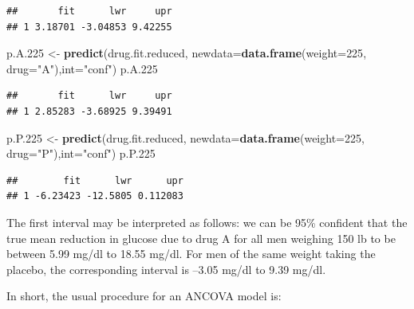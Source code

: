 \documentclass[
]{book}
\newenvironment{Shaded}{\begin{snugshade}}{\end{snugshade}}
\newcommand{\AttributeTok}[1]{\textcolor[rgb]{0.13,0.29,0.53}{#1}}
\newcommand{\DecValTok}[1]{\textcolor[rgb]{0.00,0.00,0.81}{#1}}
\newcommand{\FloatTok}[1]{\textcolor[rgb]{0.00,0.00,0.81}{#1}}
\newcommand{\FunctionTok}[1]{\textcolor[rgb]{0.13,0.29,0.53}{\textbf{#1}}}
\newcommand{\NormalTok}[1]{#1}
\newcommand{\OtherTok}[1]{\textcolor[rgb]{0.56,0.35,0.01}{#1}}
\newcommand{\StringTok}[1]{\textcolor[rgb]{0.31,0.60,0.02}{#1}}
\begin{document}
\begin{verbatim}
##       fit      lwr     upr
## 1 3.18701 -3.04853 9.42255
\end{verbatim}

\begin{Shaded}
\begin{Highlighting}[]
\NormalTok{p.A}\FloatTok{.225} \OtherTok{\textless{}{-}} \FunctionTok{predict}\NormalTok{(drug.fit.reduced, }\AttributeTok{newdata=}\FunctionTok{data.frame}\NormalTok{(}\AttributeTok{weight=}\DecValTok{225}\NormalTok{, }\AttributeTok{drug=}\StringTok{"A"}\NormalTok{),}\AttributeTok{int=}\StringTok{"conf"}\NormalTok{)}
\NormalTok{p.A}\FloatTok{.225}
\end{Highlighting}
\end{Shaded}

\begin{verbatim}
##       fit      lwr     upr
## 1 2.85283 -3.68925 9.39491
\end{verbatim}

\begin{Shaded}
\begin{Highlighting}[]
\NormalTok{p.P}\FloatTok{.225} \OtherTok{\textless{}{-}} \FunctionTok{predict}\NormalTok{(drug.fit.reduced, }\AttributeTok{newdata=}\FunctionTok{data.frame}\NormalTok{(}\AttributeTok{weight=}\DecValTok{225}\NormalTok{, }\AttributeTok{drug=}\StringTok{"P"}\NormalTok{),}\AttributeTok{int=}\StringTok{"conf"}\NormalTok{)}
\NormalTok{p.P}\FloatTok{.225}
\end{Highlighting}
\end{Shaded}

\begin{verbatim}
##        fit      lwr      upr
## 1 -6.23423 -12.5805 0.112083
\end{verbatim}

The first interval may be interpreted as follows: we can be 95\% confident that the true mean reduction in glucose due to drug A for all men weighing 150 lb to be between 5.99 mg/dl to 18.55 mg/dl. For men of the same weight taking the placebo, the corresponding interval is --3.05 mg/dl to 9.39 mg/dl.

In short, the usual procedure for an ANCOVA model is:
\end{document}
